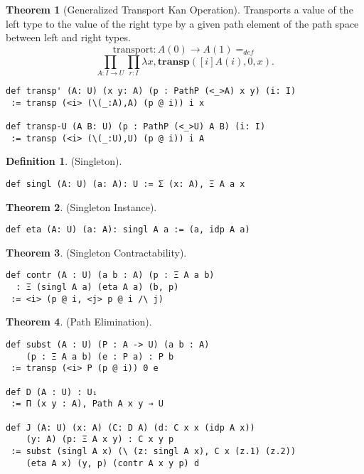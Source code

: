 \documentclass{article}
\theoremstyle{definition}
\newtheorem{definition}{Definition}
\newtheorem{theorem}{Theorem}
\begin{document}
\begin{theorem}[Generalized Transport Kan Operation]
Transports a value of the left type to the value of the right type
by a given path element of the path space between left and right types.
$$
  \mathrm{transport} : A(0) \rightarrow A(1) =_{def}
$$
$$
   \prod_{A:I\rightarrow U}\prod_{r:I} \lambda x,\mathbf{transp}([i]A(i),0,x).
$$
\begin{lstlisting}
def transp' (A: U) (x y: A) (p : PathP (<_>A) x y) (i: I)
 := transp (<i> (\(_:A),A) (p @ i)) i x

def transp-U (A B: U) (p : PathP (<_>U) A B) (i: I)
 := transp (<i> (\(_:U),U) (p @ i)) i A
\end{lstlisting}
\end{theorem}

\begin{definition} (Singleton).
\begin{lstlisting}
def singl (A: U) (a: A): U := Σ (x: A), Ξ A a x
\end{lstlisting}
\end{definition}

\begin{theorem} (Singleton Instance).
\begin{lstlisting}
def eta (A: U) (a: A): singl A a := (a, idp A a)
\end{lstlisting}
\end{theorem}

\begin{theorem} (Singleton Contractability).
\begin{lstlisting}
def contr (A : U) (a b : A) (p : Ξ A a b)
  : Ξ (singl A a) (eta A a) (b, p)
 := <i> (p @ i, <j> p @ i /\ j)
\end{lstlisting}
\end{theorem}

\begin{theorem} (Path Elimination).
\begin{lstlisting}
def subst (A : U) (P : A -> U) (a b : A)
    (p : Ξ A a b) (e : P a) : P b
 := transp (<i> P (p @ i)) 0 e

def D (A : U) : U₁
 := Π (x y : A), Path A x y → U

def J (A: U) (x: A) (C: D A) (d: C x x (idp A x))
    (y: A) (p: Ξ A x y) : C x y p
 := subst (singl A x) (\ (z: singl A x), C x (z.1) (z.2))
    (eta A x) (y, p) (contr A x y p) d
\end{lstlisting}
\end{theorem}
\end{document}
